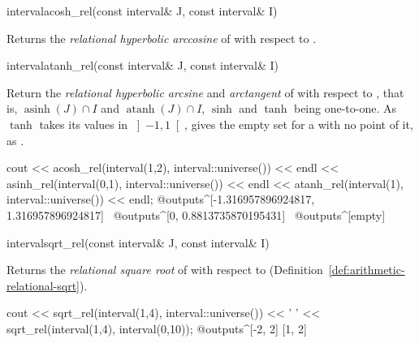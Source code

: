 \documentclass[12pt,a4paper,twoside,openright]{book}
\begin{document}
\begin{deffun}{interval}{acosh\_rel}{(const interval\& J, const interval\& I)}
  \begin{operation}
  \end{operation}
  Returns the \emph{relational hyperbolic arccosine} of  with respect
  to .
\end{deffun}

\begin{deffun}{interval}{atanh\_rel}{(const interval\& J, const interval\& I)}
  \begin{operation}
  \end{operation}
  Return the \emph{relational hyperbolic arcsine} and \emph{arctangent} of
   with respect to , that is, $\operatorname{asinh}(J)\cap I$
  and $\operatorname{atanh}(J)\cap I$, $\sinh$ and $\tanh$ being one-to-one.
  As $\tanh$ takes its values in $\left]-1,1\right[$, 
  gives the empty set for a  with no point of it, as .
\begin{example}
cout << acosh_rel(interval(1,2), interval::universe()) << endl
     << asinh_rel(interval(0,1), interval::universe()) << endl
     << atanh_rel(interval(1), interval::universe()) << endl;
@outputs^[-1.316957896924817, 1.316957896924817]~
@outputs^[0, 0.8813735870195431]~
@outputs^[empty]~
\end{example}
\end{deffun}

\begin{deffun}{interval}{sqrt\_rel}{(const interval\& J, const interval\& I)}
  \begin{operation}
  \end{operation}
  Returns the \emph{relational square root} of  with respect to
   (Definition~\ref{def:arithmetic-relational-sqrt}).
\begin{example}
cout << sqrt_rel(interval(1,4), interval::universe()) << ' '
     << sqrt_rel(interval(1,4), interval(0,10));
@outputs^[-2, 2] [1, 2]~
\end{example}
\end{deffun}
\end{document}
